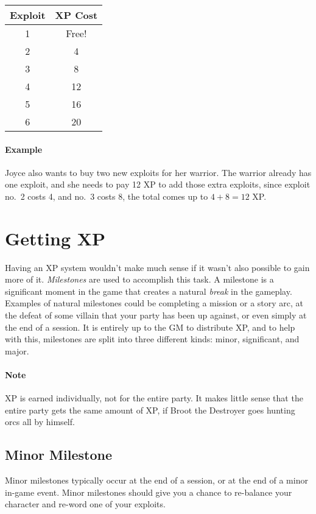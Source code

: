 \begin{center}
  \begin{tabular}{c|c}
    \textbf{Exploit} & \textbf{XP Cost}\\\hline
    1 & Free!\\
    2 & 4 \\
    3 & 8 \\
    4 & 12 \\
    5 & 16 \\
    6 & 20 \\
  \end{tabular}
\end{center}

\paragraph{Example} Joyce also wants to buy two new exploits for her warrior.
The warrior already has one exploit, and she needs to pay 12 XP to add those extra exploits, since exploit no.\ 2 costs 4, and no.\ 3 costs 8, the total comes up to $4 + 8 = 12$ XP.

\section{Getting XP}
Having an XP system wouldn't make much sense if it wasn't also possible to gain more of it.
\textit{Milestones} are used to accomplish this task.
A milestone is a significant moment in the game that creates a natural \textit{break} in the gameplay.
Examples of natural milestones could be completing a mission or a story arc, at the defeat of some villain that your party has been up against, or even simply at the end of a session.
It is entirely up to the GM to distribute XP, and to help with this, milestones are split into three different kinds: minor, significant, and major.

\paragraph{Note} XP is earned individually, not for the entire party.
It makes little sense that the entire party gets the same amount of XP, if Broot the Destroyer goes hunting orcs all by himself.

\subsection{Minor Milestone}
Minor milestones typically occur at the end of a session, or at the end of a minor in-game event.
Minor milestones should give you a chance to re-balance your character and re-word one of your exploits.

